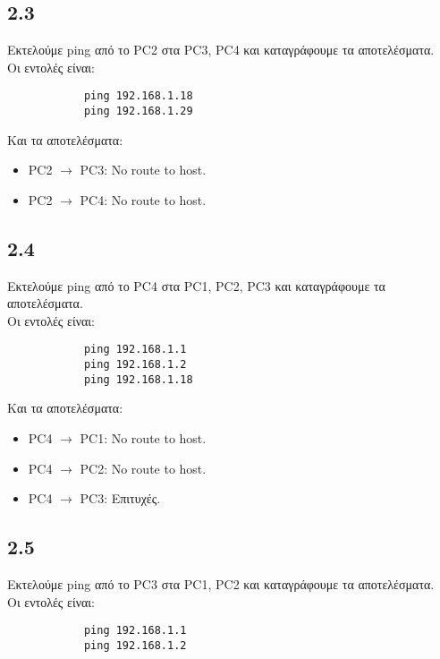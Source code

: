\documentclass[a4paper, 12pt]{article}
\begin{document}
	\subsection*{2.3}
		Εκτελούμε ping από το PC2 στα PC3, PC4 και καταγράφουμε τα αποτελέσματα. \\
		
		Οι εντολές είναι: 
		
		\begin{verbatim}
			ping 192.168.1.18
			ping 192.168.1.29
		\end{verbatim}
		
		Και τα αποτελέσματα:
		
		\begin{itemize}
			\item PC2 $\rightarrow$ PC3: No route to host.
			\item PC2 $\rightarrow$ PC4: No route to host.	
		\end{itemize}

	\subsection*{2.4}
		Εκτελούμε ping από το PC4 στα PC1, PC2, PC3 και καταγράφουμε τα αποτελέσματα. \\
		
		Οι εντολές είναι: 
		
		\begin{verbatim}
			ping 192.168.1.1
			ping 192.168.1.2
			ping 192.168.1.18
		\end{verbatim}
		
		Και τα αποτελέσματα:

		\begin{itemize}
			\item PC4 $\rightarrow$ PC1: No route to host.
			\item PC4 $\rightarrow$ PC2: No route to host.
			\item PC4 $\rightarrow$ PC3: Επιτυχές.
		\end{itemize}

	\subsection*{2.5}
		Εκτελούμε ping από το PC3 στα PC1, PC2 και καταγράφουμε τα αποτελέσματα. \\
		
		Οι εντολές είναι: 
		
		\begin{verbatim}
			ping 192.168.1.1
			ping 192.168.1.2
		\end{verbatim}
		
\end{document}
